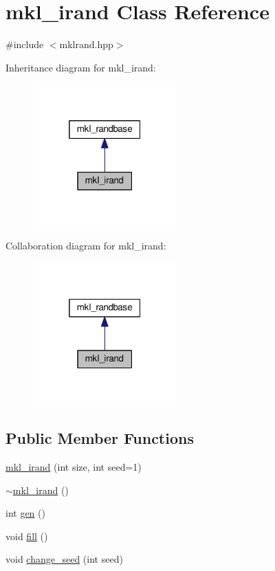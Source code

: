 \hypertarget{classmkl__irand}{}\section{mkl\+\_\+irand Class Reference}
\label{classmkl__irand}


{\ttfamily \#include $<$mklrand.\+hpp$>$}



Inheritance diagram for mkl\+\_\+irand\+:
\nopagebreak
\begin{figure}[H]
\begin{center}
\leavevmode
\includegraphics[width=157pt]{d2/db8/classmkl__irand__inherit__graph}
\end{center}
\end{figure}


Collaboration diagram for mkl\+\_\+irand\+:
\nopagebreak
\begin{figure}[H]
\begin{center}
\leavevmode
\includegraphics[width=157pt]{d2/d34/classmkl__irand__coll__graph}
\end{center}
\end{figure}
\subsection*{Public Member Functions}
\begin{DoxyCompactItemize}
\item 
\hyperlink{classmkl__irand_a49334a7d684e4c15fe276b1d6977ea84}{mkl\+\_\+irand} (int size, int seed=1)
\item 
\hyperlink{classmkl__irand_ab4fd6d8a1c2d357dcda060f9d0463b9f}{$\sim$mkl\+\_\+irand} ()
\item 
int \hyperlink{classmkl__irand_abcc5f45f841350869e03328fd2a8b3ad}{gen} ()
\item 
void \hyperlink{classmkl__irand_a49daff911e5fd2f187a8c158ec1aa33b}{fill} ()
\item 
void \hyperlink{classmkl__irand_accf32e15b66fa1bb80a2615cca68d8d6}{change\+\_\+seed} (int seed)
\end{DoxyCompactItemize}
